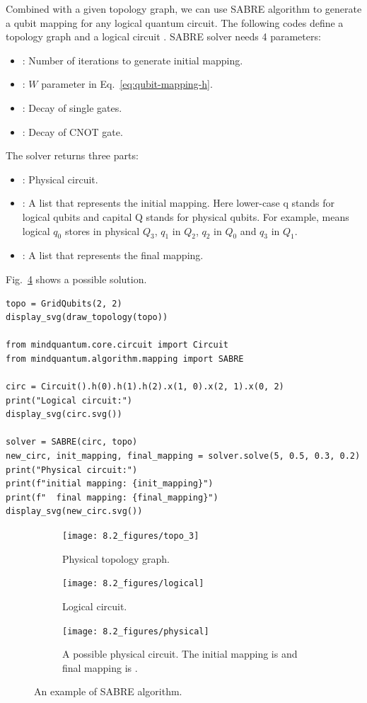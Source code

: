 Combined with a given topology graph, we can use SABRE algorithm to generate a qubit mapping for any logical quantum circuit. The following codes define a topology graph  and a logical circuit . SABRE solver needs 4 parameters:
\begin{itemize}
	\item {}: Number of iterations to generate initial mapping.
	\item {}: $W$ parameter in Eq.~\eqref{eq:qubit-mapping-h}.
	\item {}: Decay of single gates.
	\item {}: Decay of CNOT gate.
\end{itemize}
The solver returns three parts:
\begin{itemize}
	\item {}: Physical circuit.
	\item {}: A list that represents the initial mapping. Here lower-case q stands for logical qubits and capital Q stands for physical qubits. For example, \code{[3, 2, 0, 1]} means logical $q_0$ stores in physical $Q_3$, $q_1$ in $Q_2$, $q_2$ in $Q_0$ and $q_3$ in $Q_1$.
	\item {}: A list that represents the final mapping.
\end{itemize}
Fig.~\ref{fig:qubit-mapping-physical-circuit} shows a possible solution.

\begin{lstlisting}
topo = GridQubits(2, 2)
display_svg(draw_topology(topo))

from mindquantum.core.circuit import Circuit
from mindquantum.algorithm.mapping import SABRE

circ = Circuit().h(0).h(1).h(2).x(1, 0).x(2, 1).x(0, 2)
print("Logical circuit:")
display_svg(circ.svg())

solver = SABRE(circ, topo)
new_circ, init_mapping, final_mapping = solver.solve(5, 0.5, 0.3, 0.2)
print("Physical circuit:")
print(f"initial mapping: {init_mapping}")
print(f"  final mapping: {final_mapping}")
display_svg(new_circ.svg())
\end{lstlisting}

\begin{figure}
	\centering
	\begin{subfigure}{0.1\textwidth}
		\texttt{[image: 8.2\_figures/topo\_3]}
		\caption{Physical topology graph.}
		\label{fig:qubit-mapping-physical-topo}
	\end{subfigure}
	\begin{subfigure}{0.35\textwidth}
		\texttt{[image: 8.2\_figures/logical]}
		\caption{Logical circuit.}
		\label{fig:qubit-mapping-logical-circuit}
	\end{subfigure}
	\begin{subfigure}{0.45\textwidth}
		\texttt{[image: 8.2\_figures/physical]}
		\caption{A possible physical circuit. The initial mapping is \code{[3, 2, 0, 1]} and final mapping is \code{[1, 2, 0, 3]}.}
		\label{fig:qubit-mapping-physical-circuit}
	\end{subfigure}

	\caption{An example of SABRE algorithm.}
\end{figure}

